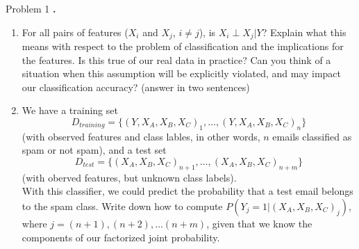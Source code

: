\documentclass{article}
\newcounter{pcounter}                                   %
\newenvironment{problem}                                %
{                                                       %
    \color{gray}                                        %
    \stepcounter{pcounter}                              %
    \textbf{\arabic{pcounter}.}                         %
}{}                                                     %
\begin{document}
\begin{section}{Problem 1}
\begin{problem}
\begin{enumerate}[label=(\alph*)]
                \item For all pairs of features ($X_i$ and $X_j$, $i \neq j$),
                is $X_i \perp X_j | Y$? Explain what this means with respect to the problem of classification and the implications for the features.
                Is this true of our real data in practice?
                Can you think of a situation when this assumption will be explicitly violated, and may impact our classification accuracy? (answer in two sentences)
                \item We have a training set
                      $$
                      D_{training} = \{ (Y, X_A, X_B, X_C)_1, \dots, (Y, X_A, X_B, X_C)_n \}
                      $$
                    (with observed features and class lables, in other words, $n$ emails classified as spam or not spam), and a test set
                      $$
                      D_{test} = \{ (X_A, X_B, X_C)_{n+1}, \dots, (X_A, X_B, X_C)_{n+m} \}
                      $$
                    (with oberved features, but unknown class labels).\\
                    With this classifier, we could predict the probability that a test email belongs to the spam class. Write down how to compute $P(Y_j=1 | (X_A, X_B, X_C)_j)$, where $j=(n+1), (n+2), \dots (n+m)$, given that we know the components of our factorized joint probability.
            \end{enumerate}
        \end{problem}


\end{section}
\end{document}
